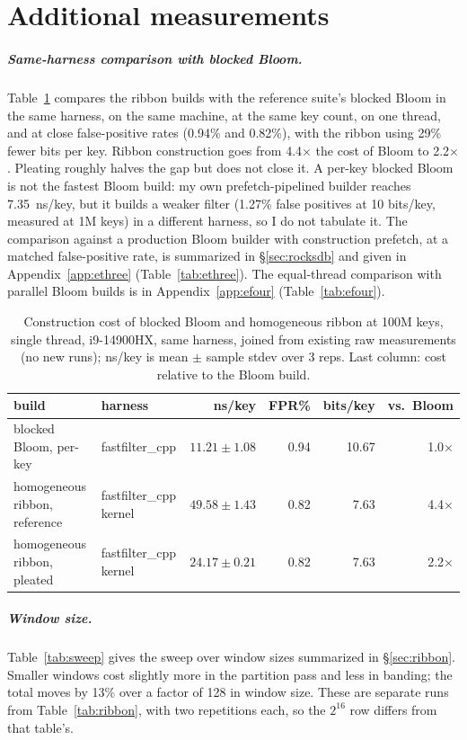 \documentclass[a4paper,UKenglish,cleveref,autoref,thm-restate,anonymous]{lipics-v2021}
\begin{document}
\section{Additional measurements}\label{app:extra}
\subparagraph*{Same-harness comparison with blocked Bloom.} Table~\ref{tab:bloomgap} compares the ribbon builds with
the reference suite's blocked Bloom in the same harness, on the same machine, at the same key count,
on one thread, and at close false-positive rates (0.94\% and 0.82\%), with the ribbon using
29\% fewer bits per key. Ribbon construction goes from 4.4$\times$
the cost of Bloom to 2.2$\times$. Pleating roughly halves the gap but does not close
it. A per-key blocked Bloom is not the fastest Bloom build: my own prefetch-pipelined builder
reaches 7.35~ns/key, but it builds a weaker filter (1.27\% false positives at 10
bits/key, measured at 1M keys) in a different harness, so I do not tabulate it.
The comparison against a production Bloom builder with construction prefetch, at a matched
false-positive rate, is summarized in \S\ref{sec:rocksdb} and given in Appendix~\ref{app:ethree} (Table~\ref{tab:ethree}). The equal-thread comparison with parallel Bloom builds is in Appendix~\ref{app:efour}
(Table~\ref{tab:efour}).

\begin{table}
\caption{Construction cost of blocked Bloom and homogeneous ribbon at 100M keys, single thread,
i9-14900HX, same harness, joined from existing raw measurements (no new runs); ns/key is mean $\pm$
sample stdev over 3 reps. Last column: cost relative to the Bloom build.}
\label{tab:bloomgap}
\small\setlength{\tabcolsep}{3pt}
\begin{tabular}{llrrrr}
\toprule
build & harness & ns/key & FPR\% & bits/key & vs.\ Bloom \\
\midrule
blocked Bloom, per-key & fastfilter\_cpp & $11.21\pm1.08$ & 0.94 & 10.67 & 1.0$\times$ \\
\midrule
homogeneous ribbon, reference & fastfilter\_cpp kernel & $49.58\pm1.43$ & 0.82 & 7.63 & 4.4$\times$ \\
homogeneous ribbon, pleated & fastfilter\_cpp kernel & $24.17\pm0.21$ & 0.82 & 7.63 & 2.2$\times$ \\
\bottomrule
\end{tabular}
\end{table}

\subparagraph*{Window size.} Table~\ref{tab:sweep} gives the sweep over window sizes summarized in
\S\ref{sec:ribbon}. Smaller windows cost slightly more in the partition pass and less in banding;
the total moves by 13\% over a factor of 128 in window size. These are separate runs from
Table~\ref{tab:ribbon}, with two repetitions each, so the $2^{16}$ row differs from that table's.
\end{document}

